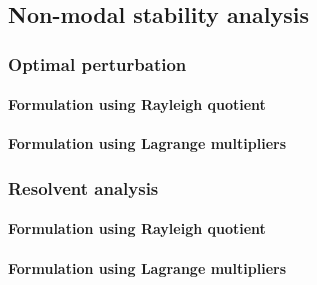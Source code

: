   \subsection{Non-modal stability analysis}
  \label{subsec: theory-non-modal stability}

    \subsubsection{Optimal perturbation}
    \label{subsubsec: theory-optimal perturbation}

      \paragraph{Formulation using Rayleigh quotient}

      \paragraph{Formulation using Lagrange multipliers}

    \subsubsection{Resolvent analysis}
    \label{subsubsec: theory-resolvent}

        \paragraph{Formulation using Rayleigh quotient}

        \paragraph{Formulation using Lagrange multipliers}
